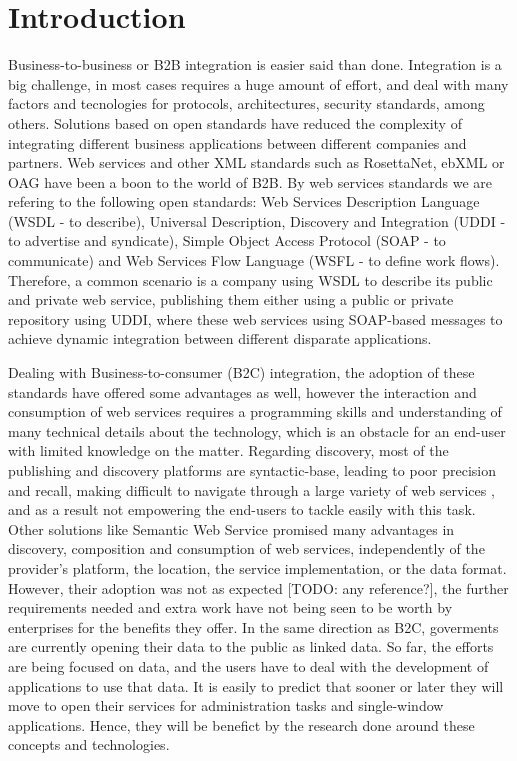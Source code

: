 
\section{Introduction}

Business-to-business or B2B integration is easier said than done. Integration is a big challenge, in most cases requires a huge amount of effort, and deal with many factors and tecnologies for protocols, architectures, security standards, among others. Solutions based on open standards have reduced the complexity of integrating different business applications between different companies and partners. Web services and other XML standards such as RosettaNet, ebXML or OAG have been a boon to the world of B2B. By web services standards we are refering to the following open standards: Web Services Description Language (WSDL - to describe), Universal Description, Discovery and Integration (UDDI - to advertise and syndicate), Simple Object Access Protocol (SOAP - to communicate) and Web Services Flow Language (WSFL - to define work flows). Therefore, a common scenario is a company using WSDL to describe its public and private web service, publishing them either using a public or private repository using UDDI, where these web services using SOAP-based messages to achieve dynamic integration between different disparate applications.

Dealing with Business-to-consumer (B2C) integration, the adoption of these standards have offered some advantages as well, however the interaction and consumption of web services requires a programming skills and understanding of many technical details about the technology, which is an obstacle for an end-user with limited knowledge on the matter. Regarding discovery, most of the publishing and discovery platforms are syntactic-base, leading to poor precision and recall, making difficult to navigate through a large variety of web services \cite{pilioura_acm2009}, and as a result not empowering the end-users to tackle easily with this task. Other solutions like Semantic Web Service promised many advantages in discovery, composition and consumption of web services, independently of the provider's platform, the location, the service implementation, or the data format. However, their adoption was not as expected [TODO: any reference?], the further requirements needed and extra work have not being seen to be worth by enterprises for the benefits they offer. In the same direction as B2C, goverments are currently opening their data to the public as linked data. So far, the efforts are being focused on data, and the users have to deal with the development of applications to use that data. It is easily to predict that sooner or later they will move to open their services for administration tasks and single-window applications. Hence, they will be benefict by the research done around these concepts and technologies.

